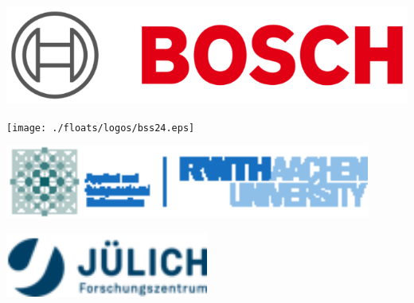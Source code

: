 \documentclass[25pt, a0paper,
portrait,
margin=2mm, 
innermargin=2mm, 
blockverticalspace=7mm, %
colspace=2mm, %
subcolspace=0mm]{tikzposter}
\begin{document}
{\begin{minipage}{0.1\textwidth}
		\begin{flushright}
			\includegraphics[width=1.1\textwidth]{./floats/logos/bosch_spring_school_2024Mar.eps}
		\end{flushright}
	\end{minipage}
	\hfill
	\begin{minipage}{0.3\textwidth}
		\begin{flushleft}
			\texttt{[image: ./floats/logos/bss24.eps]}
		\end{flushleft}
	\end{minipage}
	\hfill
	\begin{minipage}{0.2\textwidth}
		\begin{flushright}
			\includegraphics[width=0.9\textwidth]{./floats/logos/acomrwth.eps}
		\end{flushright}
	\end{minipage}
	\hfill
	\begin{minipage}{0.2\textwidth}
		\begin{flushleft}
			\includegraphics[width=0.5\textwidth]{./floats/logos/fzj.eps}
		\end{flushleft}
	\end{minipage}
	\vspace{-5mm}
}
\end{document}
